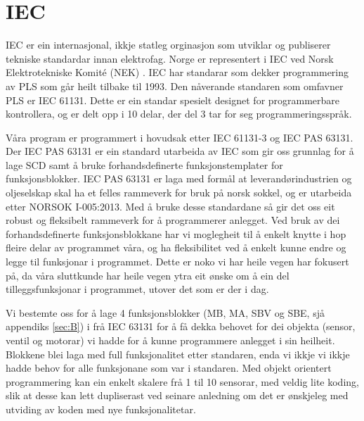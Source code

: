 \section{IEC}
\thispagestyle{fancy}

\gls{IEC} \citep{IEC} er ein internasjonal, ikkje statleg orginasjon som utviklar og publiserer tekniske standardar innan elektrofag. 
Norge er representert i IEC ved Norsk Elektrotekniske Komité (NEK) \citep{IEC-SNL}. 
IEC har standarar som dekker programmering av PLS som går heilt tilbake til 1993\citep{Wiki-93}. 
Den nåverande standaren som omfavner PLS er IEC 61131\citep{IEC-61131}. Dette er ein standar spesielt designet for programmerbare kontrollera, og er delt opp i 10 delar, der del 3 tar for seg programmeringsspråk. 

Våra program er programmert i hovudsak etter IEC 61131-3 og IEC \gls{PAS} 63131\citep{IEC-63131}. 
Der IEC PAS 63131 er ein standard utarbeida av IEC som gir oss grunnlag for å lage \gls{SCD} samt å bruke forhandsdefinerte funksjonstemplater for funksjonsblokker. 
IEC PAS 63131 er laga med formål at leverandørindustrien og oljeselskap skal ha et felles rammeverk for bruk på norsk sokkel, og er utarbeida etter NORSOK I-005:2013.
Med å bruke desse standardane så gir det oss eit robust og fleksibelt rammeverk for å programmerer anlegget. 
Ved bruk av dei forhandsdefinerte funksjonsblokkane har vi moglegheit til å enkelt knytte i hop fleire delar av programmet våra, og ha fleksibilitet ved å enkelt kunne endre og legge til funksjonar i programmet. 
Dette er noko vi har heile vegen har fokusert på, da våra sluttkunde har heile vegen ytra eit ønske om å ein del tilleggsfunksjonar i programmet, utover det som er der i dag. 

Vi bestemte oss for å lage 4 funksjonsblokker (MB, MA, SBV og SBE, sjå appendiks \ref{sec:B}) i frå IEC 63131 for å få dekka behovet for dei objekta (sensor, ventil og motorar) vi hadde for å kunne programmere anlegget i sin heilheit. 
Blokkene blei laga med full funksjonalitet etter standaren, enda vi ikkje vi ikkje hadde behov for  alle funksjonane som var i standaren. Med objekt orientert programmering kan ein enkelt skalere frå 1 til 10 sensorar, med veldig lite koding, slik at desse kan lett dupliserast ved seinare anledning om det er ønskjeleg med utviding av koden med nye funksjonalitetar. 



